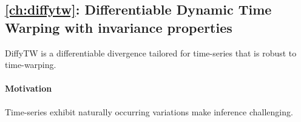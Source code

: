 





\subsection*{\cref{ch:diffytw}: Differentiable Dynamic Time Warping with invariance properties}
DiffyTW is a differentiable divergence tailored for time-series that is robust to time-warping.

\paragraph{Motivation}
Time-series exhibit naturally occurring variations make inference challenging.

